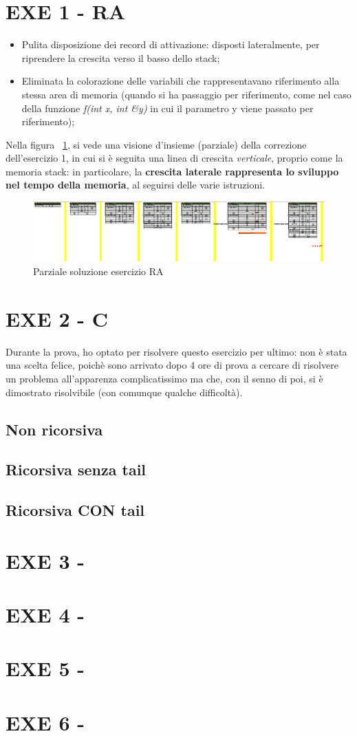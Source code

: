 \section{EXE 1 - RA}
\begin{itemize}
	\item Pulita disposizione dei record di attivazione: disposti lateralmente, per riprendere la crescita verso il basso dello stack;
	\item Eliminata la colorazione delle variabili che rappresentavano riferimento alla stessa area di memoria (quando si ha passaggio per riferimento, come nel caso della funzione \textit{f(int x, int \&y)} in cui il parametro y viene passato per riferimento);
\end{itemize}

Nella figura ~\ref{fig:ra}, si vede una visione d'insieme (parziale) della correzione dell'esercizio 1, in cui si è seguita una linea di crescita \textit{verticale}, proprio come la memoria stack: in particolare, la \textbf{crescita laterale rappresenta lo sviluppo nel tempo della memoria}, al seguirsi delle varie istruzioni.
\begin{figure}[h]
	\centering
	\includegraphics[width=1\textwidth]{Immagini/Partial_RA.png}
	\caption{Parziale soluzione esercizio RA}
	\label{fig:ra}
\end{figure}

\section{EXE 2 - C}
Durante la prova, ho optato per risolvere questo esercizio per ultimo: non è stata una scelta felice, poichè sono arrivato dopo 4 ore di prova a cercare di risolvere un problema all'apparenza complicatissimo ma che, con il senno di poi, si è dimostrato risolvibile (con comunque qualche difficoltà).

\subsection{Non ricorsiva}

\subsection{Ricorsiva senza tail}
\subsection{Ricorsiva CON tail}
\section{EXE 3 - }
\section{EXE 4 - }
\section{EXE 5 - }
\section{EXE 6 - }